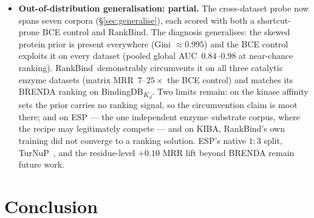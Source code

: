 \documentclass[11pt,a4paper]{article}
\newcommand{\method}{RankBind\xspace}
\newcommand{\gauc}{global AUC}
\newcommand{\matmrr}{matrix MRR}
\begin{document}
\begin{itemize}[leftmargin=*,itemsep=0pt,topsep=1pt]
        training, \S\ref{app:diagnostics}): the decoy-construction
        protocol leaks pair-level statistics into the inputs. \method's
        contribution is that this signal is \emph{removed} through the
        architecture (AUC drops to $0.68$); nevertheless, absolute
        pooled metrics on this corpus should be read with the decoy
        construction in mind, and generalisation to independent
        enzyme--substrate and DTI benchmarks (next item) is the
        cleanest control.
  \item \textbf{Out-of-distribution generalisation: partial.} The
        cross-dataset probe now spans seven corpora
        (\S\ref{sec:generalise}), each scored with both a shortcut-prone
        BCE control and \method. The diagnosis generalises: the skewed
        protein prior is present everywhere (Gini $\approx 0.995$) and
        the BCE control exploits it on every dataset (pooled \gauc\
        $0.84$--$0.98$ at near-chance ranking). \method\ demonstrably
        circumvents it on all three catalytic enzyme datasets
        (\matmrr\ $7$--$25\times$ the BCE control) and matches its
        BRENDA ranking on BindingDB\textsubscript{$K_d$}. Two limits
        remain: on the kinase affinity sets the prior carries no
        ranking signal, so the circumvention claim is moot there; and on
        ESP --- the one independent enzyme--substrate corpus, where the
        recipe may legitimately compete --- and on KIBA, \method's own
        training did not converge to a ranking solution. ESP's native
        $1{:}3$ split, TurNuP~\citep{kroll2023turnup}, and the
        residue-level $+0.10$ MRR lift beyond BRENDA remain future work.
\end{itemize}

\section{Conclusion}
\label{sec:conclusion}
\end{document}
